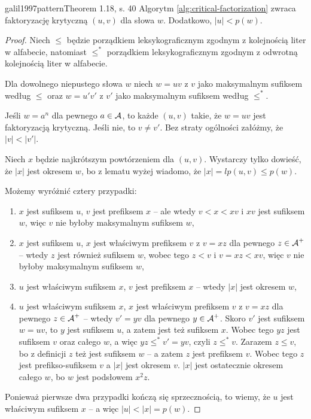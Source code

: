 \begin{code}
\inputminted{python}{code/factorization/critical-factorization.py}
\label{alg:critical-factorization}
\end{code}

\begin{theorem}{galil1997pattern}{Theorem 1.18, s. 40}
  Algorytm \ref{alg:critical-factorization} zwraca faktoryzację krytyczną $(u, v)$ dla słowa $w$. Dodatkowo, $|u| < p(w)$.
\end{theorem}

\begin{proof}
  Niech $\le$ będzie porządkiem leksykograficznym zgodnym z kolejnością liter w alfabecie, natomiast $\le^*$ porządkiem leksykograficznym zgodnym z odwrotną kolejnością liter w alfabecie.

  Dla dowolnego niepustego słowa $w$ niech $w = uv$ z $v$ jako maksymalnym sufiksem według $\le$ oraz $w = u'v'$ z $v'$ jako maksymalnym sufiksem według $\le^*$.

  Jeśli $w = a^n$ dla pewnego $a \in \operatorname{\mathcal{A}}$, to każde $(u, v)$ takie, że $w = uv$ jest faktoryzacją krytyczną.
  Jeśli nie, to $v \neq v'$. Bez straty ogólności załóżmy, że $|v| < |v'|$.

  Niech $x$ będzie najkrótszym powtórzeniem dla $(u, v)$.
  Wystarczy tylko dowieść, że $|x|$ jest okresem $w$, bo z lematu wyżej wiadomo, że $|x| = lp(u, v) \le p(w)$.

  Możemy wyróżnić cztery przypadki:
  \begin{enumerate}
    \item $x$ jest sufiksem $u$, $v$ jest prefiksem $x$ -- ale wtedy $v < x < xv$ i $xv$ jest sufiksem $w$, więc $v$ nie byłoby maksymalnym sufiksem $w$,
    \item $x$ jest sufiksem $u$, $x$ jest właściwym prefiksem $v$ z $v = xz$ dla pewnego $z \in \operatorname{\mathcal{A}}^+$ -- wtedy $z$ jest również sufiksem $w$, wobec tego $z < v$ i $v = x z < x v$, więc $v$ nie byłoby maksymalnym sufiksem $w$,
    \item $u$ jest właściwym sufiksem $x$, $v$ jest prefiksem $x$ -- wtedy $|x|$ jest okresem $w$,
    \item $u$ jest właściwym sufiksem $x$, $x$ jest właściwym prefiksem $v$ z $v = x z$ dla pewnego $z \in \operatorname{\mathcal{A}}^+$ -- wtedy $v' = y v$ dla pewnego $y \in \operatorname{\mathcal{A}}^+$. Skoro $v'$ jest sufiksem $w = u v$, to $y$ jest sufiksem $u$, a zatem jest też sufiksem $x$. Wobec tego $y z$ jest sufiksem $v$ oraz całego $w$, a więc $y z \le^* v' = y v$, czyli $z \le^* v$. Zarazem $z \le v$, bo z definicji $z$ też jest sufiksem $w$ -- a zatem $z$ jest prefiksem $v$. Wobec tego $z$ jest prefikso-sufiksem $v$ a $|x|$ jest okresem $v$. $|x|$ jest ostatecznie okresem całego $w$, bo $w$ jest podsłowem $x^2 z$.
  \end{enumerate}

  Ponieważ pierwsze dwa przypadki kończą się sprzecznością, to wiemy, że $u$ jest właściwym sufiksem $x$ -- a więc $|u| < |x| = p(w)$.
\end{proof}

